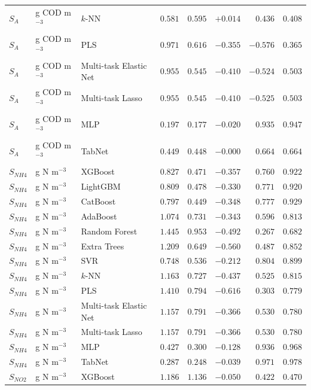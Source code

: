 \begin{longtable}{llp{3.1cm}rrrrr}
$S_{A}$ & g COD m$^{-3}$ & $k$-NN & $0.581$ & $0.595$ & $+0.014$ & $0.436$ & $0.408$ \\
$S_{A}$ & g COD m$^{-3}$ & PLS & $0.971$ & $0.616$ & $-0.355$ & $-0.576$ & $0.365$ \\
$S_{A}$ & g COD m$^{-3}$ & Multi-task Elastic Net & $0.955$ & $0.545$ & $-0.410$ & $-0.524$ & $0.503$ \\
$S_{A}$ & g COD m$^{-3}$ & Multi-task Lasso & $0.955$ & $0.545$ & $-0.410$ & $-0.525$ & $0.503$ \\
$S_{A}$ & g COD m$^{-3}$ & MLP & $0.197$ & $0.177$ & $-0.020$ & $0.935$ & $0.947$ \\
$S_{A}$ & g COD m$^{-3}$ & TabNet & $0.449$ & $0.448$ & $-0.000$ & $0.664$ & $0.664$ \\
$S_{NH4}$ & g N m$^{-3}$ & XGBoost & $0.827$ & $0.471$ & $-0.357$ & $0.760$ & $0.922$ \\
$S_{NH4}$ & g N m$^{-3}$ & LightGBM & $0.809$ & $0.478$ & $-0.330$ & $0.771$ & $0.920$ \\
$S_{NH4}$ & g N m$^{-3}$ & CatBoost & $0.797$ & $0.449$ & $-0.348$ & $0.777$ & $0.929$ \\
$S_{NH4}$ & g N m$^{-3}$ & AdaBoost & $1.074$ & $0.731$ & $-0.343$ & $0.596$ & $0.813$ \\
$S_{NH4}$ & g N m$^{-3}$ & Random Forest & $1.445$ & $0.953$ & $-0.492$ & $0.267$ & $0.682$ \\
$S_{NH4}$ & g N m$^{-3}$ & Extra Trees & $1.209$ & $0.649$ & $-0.560$ & $0.487$ & $0.852$ \\
$S_{NH4}$ & g N m$^{-3}$ & SVR & $0.748$ & $0.536$ & $-0.212$ & $0.804$ & $0.899$ \\
$S_{NH4}$ & g N m$^{-3}$ & $k$-NN & $1.163$ & $0.727$ & $-0.437$ & $0.525$ & $0.815$ \\
$S_{NH4}$ & g N m$^{-3}$ & PLS & $1.410$ & $0.794$ & $-0.616$ & $0.303$ & $0.779$ \\
$S_{NH4}$ & g N m$^{-3}$ & Multi-task Elastic Net & $1.157$ & $0.791$ & $-0.366$ & $0.530$ & $0.780$ \\
$S_{NH4}$ & g N m$^{-3}$ & Multi-task Lasso & $1.157$ & $0.791$ & $-0.366$ & $0.530$ & $0.780$ \\
$S_{NH4}$ & g N m$^{-3}$ & MLP & $0.427$ & $0.300$ & $-0.128$ & $0.936$ & $0.968$ \\
$S_{NH4}$ & g N m$^{-3}$ & TabNet & $0.287$ & $0.248$ & $-0.039$ & $0.971$ & $0.978$ \\
$S_{NO2}$ & g N m$^{-3}$ & XGBoost & $1.186$ & $1.136$ & $-0.050$ & $0.422$ & $0.470$ \\

\end{longtable}
